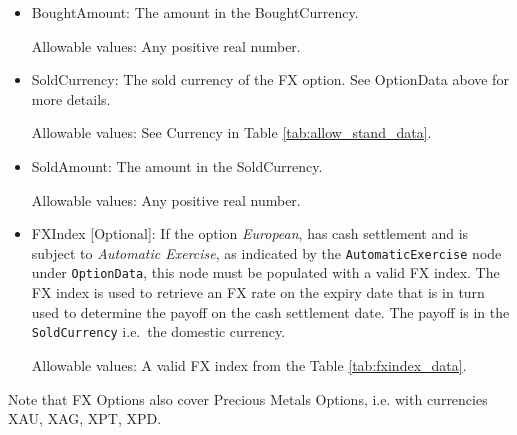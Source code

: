 \begin{itemize}
\item BoughtAmount: The amount in the BoughtCurrency.

Allowable values: Any positive real number.

\item SoldCurrency: The sold currency of the FX option. See OptionData above for more details.

Allowable values: See Currency in Table \ref{tab:allow_stand_data}.

\item SoldAmount: The amount in the SoldCurrency.

Allowable values: Any positive real number.

\item FXIndex [Optional]: If the option \textit{European}, has cash settlement and is subject to \textit{Automatic Exercise}, as indicated by the \lstinline!AutomaticExercise! node under \lstinline!OptionData!, this node must be populated with a valid FX index. The FX index is used to retrieve an FX rate on the expiry date that is in turn used to determine the payoff on the cash settlement date. The payoff is in the \lstinline!SoldCurrency! i.e.\ the domestic currency.

Allowable values: A valid FX index from the Table \ref{tab:fxindex_data}.

\end{itemize}

Note that FX Options also cover Precious Metals Options, i.e. with currencies XAU, XAG, XPT, XPD.